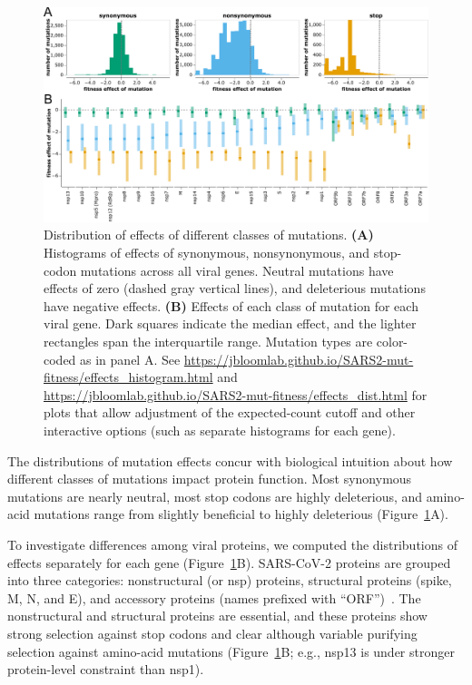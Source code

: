 \documentclass[9pt,twocolumn,twoside]{gsajnl_modified}
\begin{document}
\begin{figure}
\includegraphics[width=\linewidth]{figs/dist.pdf}
\caption{
Distribution of effects of different classes of mutations.
{\bf (A)}
Histograms of effects of synonymous, nonsynonymous, and stop-codon mutations across all viral genes.
Neutral mutations have effects of zero (dashed gray vertical lines), and deleterious mutations have negative effects.
{\bf (B)}
Effects of each class of mutation for each viral gene.
Dark squares indicate the median effect, and the lighter rectangles span the interquartile range.
Mutation types are color-coded as in panel A.
See \url{https://jbloomlab.github.io/SARS2-mut-fitness/effects_histogram.html} and \url{https://jbloomlab.github.io/SARS2-mut-fitness/effects_dist.html} for plots that allow adjustment of the expected-count cutoff and other interactive options (such as separate histograms for each gene).
\label{fig:dist}
}
\end{figure}

The distributions of mutation effects concur with biological intuition about how different classes of mutations impact protein function.
Most synonymous mutations are nearly neutral, most stop codons are highly deleterious, and amino-acid mutations range from slightly beneficial to highly deleterious (Figure~\ref{fig:dist}A).

To investigate differences among viral proteins, we computed the distributions of effects separately for each gene (Figure~\ref{fig:dist}B).
SARS-CoV-2 proteins are grouped into three categories: nonstructural (or nsp) proteins, structural proteins (spike, M, N, and E), and accessory proteins (names prefixed with ``ORF'')~\citep{v2021coronavirus}.
The nonstructural and structural proteins are essential, and these proteins show strong selection against stop codons and clear although variable purifying selection against amino-acid mutations (Figure~\ref{fig:dist}B; e.g., nsp13 is under stronger protein-level constraint than nsp1).
\end{document}
